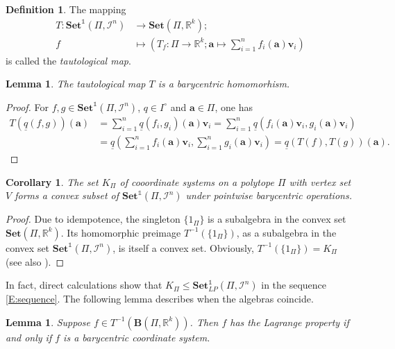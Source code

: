 \documentclass[12pt]{amsart}
\theoremstyle{plain}
\newtheorem{corollary}[theorem]{Corollary}
\newtheorem{lemma}[theorem]{Lemma}
\theoremstyle{definition}
\newtheorem{definition}[theorem]{Definition}
\numberwithin{equation}{section}
\begin{document}
\begin{definition}\cite[(2.6)]{G}
The mapping
\begin{align*}
T\colon \mathbf{Set}^{\mathds 1}(\Pi,\mathcal{I}^n)&\to \mathbf{Set}(\Pi,\mathbb{R}^k);\\
f&\mapsto \left(T_f\colon \Pi\to \mathbb{R}^k;\mathbf{a}\mapsto\sum_{i=1}^nf_i(\mathbf{a})\mathbf{v}_i\right)
\end{align*}
is called the \emph{tautological map}.
\end{definition}
\begin{lemma}
The tautological map $T$ is a barycentric homomorhism.
\end{lemma}
\begin{proof}
For $f,g\in \mathbf{Set}^{\mathds 1}(\Pi,\mathcal{I}^n)$, $q\in I^\circ$ and $\mathbf{a}\in \Pi$, one has
\begin{align*}
T\left(\underline{q}(f,g)\right)(\mathbf{a})&=\sum_{i=1}^n\underline{q}(f_i,g_i)(\mathbf{a})\mathbf{v}_i=\sum_{i=1}^n\underline{q}(f_i(\mathbf{a})\mathbf{v}_i,g_i(\mathbf{a})\mathbf{v}_i)\\
&=\underline{q}(\sum_{i=1}^nf_i(\mathbf{a})\mathbf{v}_i,\sum_{i=1}^ng_i(\mathbf{a})\mathbf{v}_i)=\underline{q}\left(T(f),T(g)\right)(\mathbf{a}).
\end{align*}
\end{proof}
\begin{corollary}\cite[Theorem 6.6]{RSZ1}\label{C:KPi}
The set $K_\Pi$ of cooordinate systems on a polytope $\Pi$ with vertex set $V$ forms a convex subset of $\mathbf{Set}^{\mathds 1}(\Pi,\mathcal{I}^n)$ under pointwise barycentric operations.
\end{corollary}
\begin{proof}
Due to idempotence, the singleton $\{1_\Pi\}$ is a subalgebra in the convex set $\mathbf{Set}(\Pi,\mathbb{R}^k)$. Its homomorphic preimage  $T^{-1}(\{1_\Pi\})$, as a subalgebra in the convex set $\mathbf{Set}^{\mathds 1}(\Pi,\mathcal{I}^n)$, is itself a convex set. Obviously, $T^{-1}(\{1_\Pi\})=K_\Pi$ (see also \cite[Proposition 2.1]{G}).
\end{proof}
In fact, direct calculations show that $K_\Pi\leq\mathbf{Set}_{LP}^{\mathds 1}(\Pi,\mathcal{I}^n)$ in the sequence \eqref{E:sequence}. The following lemma describes when the algebras coincide.

\begin{lemma}\cite[Theorem 2.3]{G}
Suppose $f\in T^{-1}\left(\mathbf{B}(\Pi,\mathbb{R}^k)\right)$. Then $f$ has the Lagrange property if and only if $f$ is a barycentric coordinate system.
\end{lemma}
\end{document}
